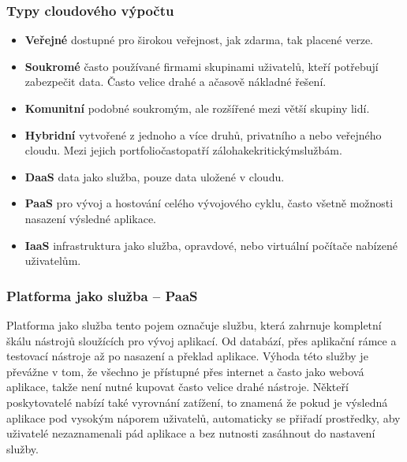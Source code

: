 \subsubsection{Typy cloudového výpočtu}
\begin{itemize}
  \item \textbf{Veřejné} dostupné pro širokou veřejnost, jak zdarma, tak placené verze.
  \item \textbf{Soukromé} často používané firmami skupinami uživatelů, kteří potřebují zabezpečit data. Často velice drahé a ačasově nákladné řešení.
  \item \textbf{Komunitní} podobné soukromým, ale rozšířené mezi větší skupiny lidí.
  \item \textbf{Hybridní} vytvořené z jednoho a více druhů, privatního a nebo veřejného cloudu. Mezi jejich portfoliočastopatří zálohakekritickýmslužbám.
  \item \textbf{DaaS} data jako služba, pouze data uložené v cloudu.
  \item \textbf{PaaS} pro vývoj a hostování celého vývojového cyklu, často všetně možnosti nasazení výsledné aplikace.
  \item \textbf{IaaS} infrastruktura jako služba, opravdové, nebo virtuální počítače nabízené uživatelům. \cite{cloud-computing} \label{IaaS}
\end{itemize}

\subsubsection{Platforma jako služba -- PaaS}
Platforma jako služba tento pojem označuje službu, která zahrnuje kompletní škálu nástrojů sloužících pro vývoj aplikací. Od databází, přes aplikační rámce a testovací nástroje až po nasazení a překlad aplikace. Výhoda této služby je převážne v tom, že všechno je přístupné přes internet a často jako webová aplikace, takže není nutné kupovat často velice drahé nástroje. Někteří poskytovatelé nabízí také vyrovnání zatížení, to znamená že pokud je výsledná aplikace pod vysokým náporem uživatelů, automaticky se přiřadí prostředky, aby uživatelé nezaznamenali pád aplikace a bez nutnosti zasáhnout do nastavení služby.\cite{essentials-cloud}

